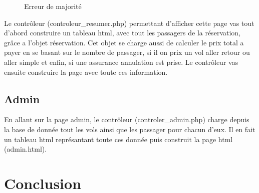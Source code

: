 \documentclass[12pt,a4paper]{article}
\begin{document}
			\begin{figure}
				\caption{Erreur de majorité}
				\label{fig:ageError}
			\end{figure}

			Le contrôleur (controleur\_resumer.php) permettant d'afficher cette page vas tout d'abord construire un tableau html, avec tout les passagers  de la réservation, grâce a l'objet réservation. Cet objet se charge aussi de calculer le prix total a payer en se basant sur le nombre de passager, si il on prix un vol aller retour ou aller simple et enfin, si une assurance annulation est prise. Le contrôleur vas ensuite construire la page avec toute ces information.

		\subsection{Admin}
			En allant sur la page admin, le contrôleur (controler\_admin.php) charge depuis la base de donnée tout les vols ainsi que les passager pour chacun d'eux. Il en fait un tableau html représantant toute ces donnée puis construit la page html (admin.html).

	\section*{Conclusion}
\end{document}
